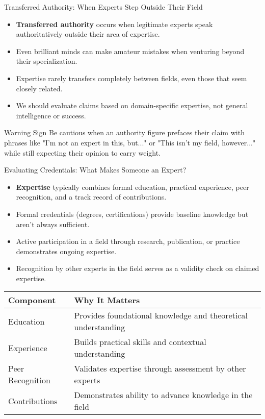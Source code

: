 \documentclass{beamer}
\begin{document}
\begin{frame}{Transferred Authority: When Experts Step Outside Their Field}
    \begin{itemize}
        \item \textbf{Transferred authority} occurs when legitimate experts speak authoritatively outside their area of expertise.
        \item Even brilliant minds can make amateur mistakes when venturing beyond their specialization.
        \item Expertise rarely transfers completely between fields, even those that seem closely related.
        \item We should evaluate claims based on domain-specific expertise, not general intelligence or success.
    \end{itemize}
    
    \begin{alertblock}{Warning Sign}
        Be cautious when an authority figure prefaces their claim with phrases like "I'm not an expert in this, but..." or "This isn't my field, however..." while still expecting their opinion to carry weight.
    \end{alertblock}
\end{frame}

\begin{frame}{Evaluating Credentials: What Makes Someone an Expert?}
    \begin{itemize}
        \item \textbf{Expertise} typically combines formal education, practical experience, peer recognition, and a track record of contributions.
        \item Formal credentials (degrees, certifications) provide baseline knowledge but aren't always sufficient.
        \item Active participation in a field through research, publication, or practice demonstrates ongoing expertise.
        \item Recognition by other experts in the field serves as a validity check on claimed expertise.
    \end{itemize}
    
    \begin{table}
        \centering
        \begin{tabular}{|l|p{7cm}|}
            \hline
            \textbf{Component} & \textbf{Why It Matters} \\
            \hline
            Education & Provides foundational knowledge and theoretical understanding \\
            Experience & Builds practical skills and contextual understanding \\
            Peer Recognition & Validates expertise through assessment by other experts \\
            Contributions & Demonstrates ability to advance knowledge in the field \\
            \hline
        \end{tabular}
    \end{table}
\end{frame}
\end{document}
